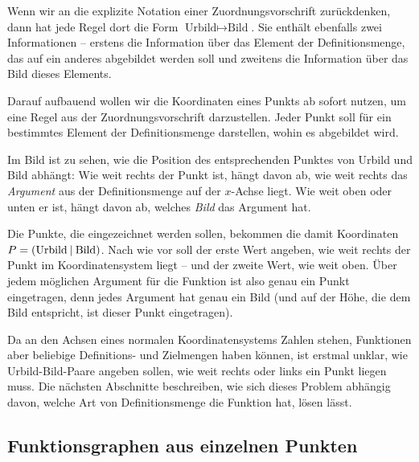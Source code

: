 \documentclass[../../main.tex]{subfiles}
\begin{document}
Wenn wir an die explizite Notation einer Zuordnungsvorschrift zurückdenken, dann hat jede Regel dort die Form $\text{Urbild}\mapsto\text{Bild}$. Sie enthält ebenfalls zwei Informationen -- erstens die Information über das Element der Definitionsmenge, das auf ein anderes abgebildet werden soll und zweitens die Information über das Bild dieses Elements.

Darauf aufbauend wollen wir die Koordinaten eines Punkts ab sofort nutzen, um eine Regel aus der Zuordnungsvorschrift darzustellen. Jeder Punkt soll für ein bestimmtes Element der Definitionsmenge darstellen, wohin es abgebildet wird.

\parpic[r]{
    
}

Im Bild ist zu sehen, wie die Position des entsprechenden Punktes von Urbild und Bild abhängt: Wie weit rechts der Punkt ist, hängt davon ab, wie weit rechts das \emph{Argument} aus der Definitionsmenge auf der $x$-Achse liegt. Wie weit oben oder unten er ist, hängt davon ab, welches \emph{Bild} das Argument hat.

Die Punkte, die eingezeichnet werden sollen, bekommen die damit Koordinaten $P=\left(\text{Urbild} \:\middle|\: \text{Bild}\right)$. Nach wie vor soll der erste Wert angeben, wie weit rechts der Punkt im Koordinatensystem liegt -- und der zweite Wert, wie weit oben.
Über jedem möglichen Argument für die Funktion ist also genau ein Punkt eingetragen, denn jedes Argument hat genau ein Bild (und auf der Höhe, die dem Bild entspricht, ist dieser Punkt eingetragen).

Da an den Achsen eines normalen Koordinatensystems Zahlen stehen, Funktionen aber beliebige Definitions- und Zielmengen haben können, ist erstmal unklar, wie Urbild-Bild-Paare angeben sollen, wie weit rechts oder links ein Punkt liegen muss. Die nächsten Abschnitte beschreiben, wie sich dieses Problem abhängig davon, welche Art von Definitionsmenge die Funktion hat, lösen lässt.

\subsection{Funktionsgraphen aus einzelnen Punkten}
\label{sec:abbildungen_graphen_diskret}

\end{document}
